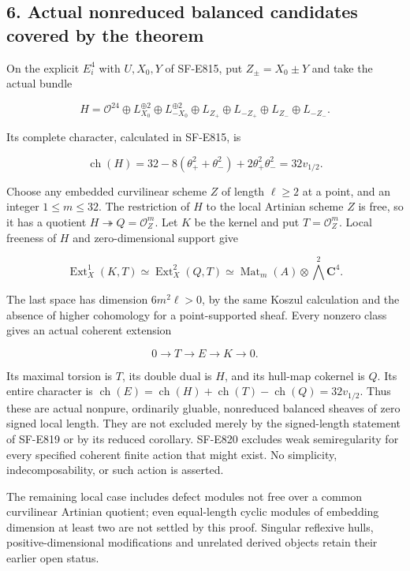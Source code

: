 \subsection{6. Actual nonreduced balanced candidates covered by the
theorem}\label{SF-E820-actual-nonreduced-balanced-candidates-covered-by-the-theorem}

On the explicit \(E_i^4\) with \(U,X_0,Y\) of SF-E815, put
\(Z_\pm=X_0\pm Y\) and take the actual bundle

\[
 H=\mathcal O^{24}\oplus L_{X_0}^{\oplus2}
       \oplus L_{-X_0}^{\oplus2}
       \oplus L_{Z_+}\oplus L_{-Z_+}
       \oplus L_{Z_-}\oplus L_{-Z_-}.
 \tag{E820.13}
\]

Its complete character, calculated in SF-E815, is

\[
 \operatorname{ch}(H)
  =32-8(\theta_+^2+\theta_-^2)
        +2\theta_+^2\theta_-^2
  =32v_{1/2}.
 \tag{E820.14}
\]

Choose any embedded curvilinear scheme \(Z\) of length \(\ell\ge2\) at a
point, and an integer \(1\le m\le32\). The restriction of \(H\) to the
local Artinian scheme \(Z\) is free, so it has a quotient
\(H\twoheadrightarrow Q=\mathcal O_Z^m\). Let \(K\) be the kernel and
put \(T=\mathcal O_Z^m\). Local freeness of \(H\) and zero-dimensional
support give

\[
 \operatorname{Ext}^1_X(K,T)
   \simeq\operatorname{Ext}^2_X(Q,T)
   \simeq\operatorname{Mat}_m(A)\otimes\bigwedge^2\mathbf C^4.
 \tag{E820.15}
\]

The last space has dimension \(6m^2\ell>0\), by the same Koszul
calculation and the absence of higher cohomology for a point-supported
sheaf. Every nonzero class gives an actual coherent extension

\[
 0\longrightarrow T\longrightarrow E\longrightarrow K
      \longrightarrow0.
 \tag{E820.16}
\]

Its maximal torsion is \(T\), its double dual is \(H\), and its hull-map
cokernel is \(Q\). Its entire character is
\(\operatorname{ch}(E)=\operatorname{ch}(H)+\operatorname{ch}(T)-\operatorname{ch}(Q)=32v_{1/2}\).
Thus these are actual nonpure, ordinarily gluable, nonreduced balanced
sheaves of zero signed local length. They are not excluded merely by the
signed-length statement of SF-E819 or by its reduced corollary. SF-E820
excludes weak semiregularity for every specified coherent finite action
that might exist. No simplicity, indecomposability, or such action is
asserted.

The remaining local case includes defect modules not free over a common
curvilinear Artinian quotient; even equal-length cyclic modules of
embedding dimension at least two are not settled by this proof. Singular
reflexive hulls, positive-dimensional modifications and unrelated
derived objects retain their earlier open status.
